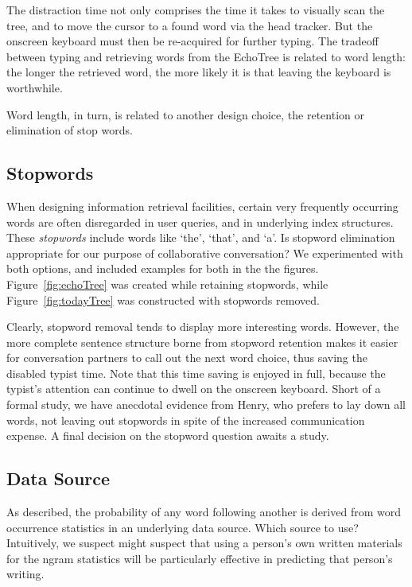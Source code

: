 \documentclass{sigchi}
\begin{document}
The distraction time not only comprises the time it takes to visually
scan the tree, and to move the cursor to a found word via the head
tracker. But the onscreen keyboard must then be re-acquired for
further typing. The tradeoff between typing and retrieving words from the
EchoTree is related to word length: the longer the retrieved word, the
more likely it is that leaving the keyboard is worthwhile.

Word length, in turn, is related to another design choice, the
retention or elimination of stop words.

\subsection{Stopwords}

When designing information retrieval facilities, certain very
frequently occurring words are often disregarded in user queries, and
in underlying index structures. These {\em stopwords} include words
like `the', `that', and `a'. Is stopword elimination appropriate for
our purpose of collaborative conversation? We experimented with both
options, and included examples for both in the the
figures. Figure~\ref{fig:echoTree} was created while retaining
stopwords, while Figure~\ref{fig:todayTree} was constructed with
stopwords removed. 

Clearly, stopword removal tends to display more interesting
words. However, the more complete sentence structure borne from
stopword retention makes it easier for conversation partners to call
out the next word choice, thus saving the disabled typist time. Note
that this time saving is enjoyed in full, because the typist's
attention can continue to dwell on the onscreen keyboard. Short of a
formal study, we have anecdotal evidence from Henry, who prefers to
lay down all words, not leaving out stopwords in spite of the
increased communication expense. A final decision on the stopword
question awaits a study.

\subsection{Data Source}

As described, the probability of any word following another is derived
from word occurrence statistics in an underlying data source. Which
source to use? Intuitively, we suspect might suspect that using a
person's own written materials for the ngram statistics will be
particularly effective in predicting that person's writing. 
\end{document}

